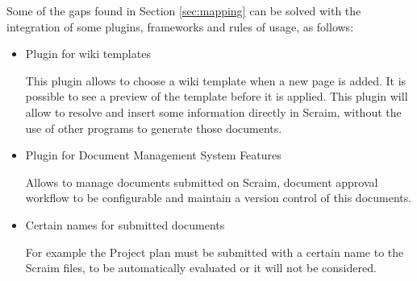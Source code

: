 Some of the gaps found in Section \ref{sec:mapping} can be solved with the integration of some plugins, frameworks and rules of usage, as follows:

\begin{itemize}
	\item Plugin for wiki templates \citep{wikitemplates}
	
	This plugin allows to choose a wiki template when a new page is added. It is possible to see a preview of the template before it is applied.
	This plugin will allow to resolve and insert some information directly in Scraim, without the use of other programs to generate those documents.
	
	\item Plugin for Document Management System Features \citep{DMSF}
	
	Allows to manage documents submitted on Scraim, document approval workflow to be configurable and maintain a version control of this documents.
	
	\item Certain names for submitted documents
	
	For example the Project plan must be submitted with a certain name to the Scraim files, to be automatically evaluated or it will not be considered.
	
\end{itemize}